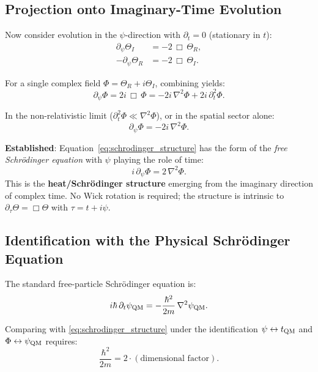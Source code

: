 \documentclass[12pt]{article}
\theoremstyle{definition}
\theoremstyle{remark}
\begin{document}
\subsection{Projection onto Imaginary-Time Evolution}

Now consider evolution in the $\psi$-direction with $\partial_t = 0$ (stationary in $t$):
\begin{align}
  \partial_\psi \Theta_I &= -2\,\Box\,\Theta_R, \label{eq:psi_evol_R}\\
  -\partial_\psi \Theta_R &= -2\,\Box\,\Theta_I. \label{eq:psi_evol_I}
\end{align}

For a single complex field $\Phi = \Theta_R + i\Theta_I$, combining yields:
\begin{equation}
  \partial_\psi \Phi = 2i\,\Box\,\Phi = -2i\,\nabla^2\Phi + 2i\,\partial_t^2\Phi.
\end{equation}

In the non-relativistic limit ($\partial_t^2\Phi \ll \nabla^2\Phi$), or in the spatial sector alone:
\begin{equation}
  \boxed{\partial_\psi \Phi = -2i\,\nabla^2\Phi.}
  \label{eq:schrodinger_structure}
\end{equation}

\begin{resultbox}
\textbf{Established}: Equation~\eqref{eq:schrodinger_structure} has the form of the
\emph{free Schrödinger equation} with $\psi$ playing the role of time:
\[
  i\,\partial_\psi \Phi = 2\,\nabla^2\Phi.
\]
This is the \textbf{heat/Schrödinger structure} emerging from the imaginary direction
of complex time.  No Wick rotation is required; the structure is intrinsic to
$\partial_\tau\Theta = \Box\Theta$ with $\tau = t + i\psi$.
\end{resultbox}

\subsection{Identification with the Physical Schrödinger Equation}

The standard free-particle Schrödinger equation is:
\begin{equation}
  i\hbar\,\partial_t\psi_{\rm QM} = -\frac{\hbar^2}{2m}\,\nabla^2\psi_{\rm QM}.
\end{equation}

Comparing with \eqref{eq:schrodinger_structure} under the identification $\psi \leftrightarrow t_{\rm QM}$
and $\Phi \leftrightarrow \psi_{\rm QM}$ requires:
\begin{equation}
  \frac{\hbar^2}{2m} = 2 \cdot (\text{dimensional factor}).
  \label{eq:diffusion_identification}
\end{equation}
\end{document}
